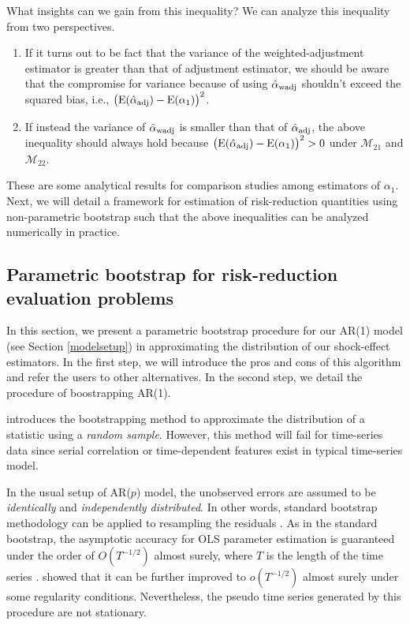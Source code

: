 \documentclass[11pt]{article}
\def\mrm#1{\mathrm{#1}} %
\def\mc#1{\mathcal{#1}} %
\def\E#1{\mathrm{E}(#1)} %
\theoremstyle{definition}
\begin{document}
 What insights can we gain from this inequality? We can analyze this inequality from two perspectives. 
 \begin{enumerate}
   \item If it turns out to be fact that the variance of the weighted-adjustment estimator is greater than that of adjustment estimator, we should be aware that  the compromise for variance because of using $\hat{\alpha}_{\rm wadj}$ shouldn't exceed the squared bias, i.e., $\big(\E{\hat{\alpha}_{\rm adj}}-\mrm{E}(\alpha_1)\big)^2$.
   \item If instead the variance of $\hat{\alpha}_{\rm wadj}$ is smaller than that of $\hat{\alpha}_{\rm adj}$, the above inequality should always hold because $\big(\E{\hat{\alpha}_{\rm adj}}-\mrm{E}(\alpha_1)\big)^2>0$ under $\mc{M}_{21}$ and $\mc{M}_{22}$. 
 \end{enumerate}
  
 These are some analytical results for comparison studies among estimators of $\alpha_1$. Next, we will detail a framework for estimation of risk-reduction  quantities using non-parametric bootstrap such that the above inequalities can be  analyzed numerically in practice.


\subsection{Parametric bootstrap for risk-reduction evaluation problems}

In this section, we present a parametric bootstrap procedure for our AR(1) model (see Section \ref{modelsetup}) in approximating the distribution of our shock-effect estimators. In the first step, we will introduce the pros and cons of this algorithm and refer the users to other alternatives. In the second step, we detail the procedure of boostrapping AR(1).

\citet{efron} introduces the bootstrapping method to approximate the distribution of a statistic using a \emph{random sample}. However, this method will fail for time-series data since serial correlation or time-dependent features exist in typical time-series model. 

In the usual setup of AR($p$) model, the unobserved errors are assumed to be \emph{identically} and \emph{independently distributed}. In other words, standard bootstrap methodology can be applied to resampling the residuals \citep{efron1986bootstrap}. As in the standard bootstrap, the asymptotic accuracy for OLS parameter estimation is guaranteed under the order of $O(T^{-1/2})$ almost surely, where $T$ is the length of the time series \citep{berkowitz2000recent}. \citet{bose1988edgeworth} showed that it can be further improved to $o(T^{-1/2})$ almost surely under some regularity conditions. Nevertheless, the pseudo time series generated by this procedure are not stationary. 
\end{document}
